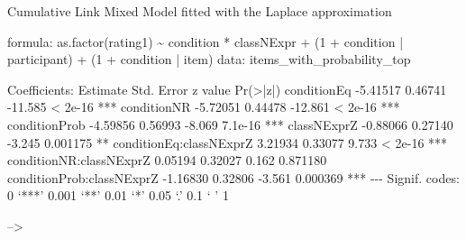 \documentclass[
  letterpaper,
  DIV=11,
  numbers=noendperiod]{scrartcl}
\newenvironment{Shaded}{\begin{snugshade}}{\end{snugshade}}
\newcommand{\DecValTok}[1]{\textcolor[rgb]{0.68,0.00,0.00}{#1}}
\newcommand{\ErrorTok}[1]{\textcolor[rgb]{0.68,0.00,0.00}{#1}}
\newcommand{\FloatTok}[1]{\textcolor[rgb]{0.68,0.00,0.00}{#1}}
\newcommand{\FunctionTok}[1]{\textcolor[rgb]{0.28,0.35,0.67}{#1}}
\newcommand{\NormalTok}[1]{\textcolor[rgb]{0.00,0.23,0.31}{#1}}
\newcommand{\SpecialCharTok}[1]{\textcolor[rgb]{0.37,0.37,0.37}{#1}}
\begin{document}
\begin{Shaded}
\begin{Highlighting}[]
\NormalTok{Cumulative Link Mixed Model fitted with the Laplace approximation}

\NormalTok{formula}\SpecialCharTok{:} \FunctionTok{as.factor}\NormalTok{(rating1) }\SpecialCharTok{\textasciitilde{}}\NormalTok{ condition }\SpecialCharTok{*}\NormalTok{ classNExpr }\SpecialCharTok{+}\NormalTok{ (}\DecValTok{1} \SpecialCharTok{+}\NormalTok{ condition }\SpecialCharTok{|}  
\NormalTok{    participant) }\SpecialCharTok{+}\NormalTok{ (}\DecValTok{1} \SpecialCharTok{+}\NormalTok{ condition }\SpecialCharTok{|}\NormalTok{ item)}
\NormalTok{data}\SpecialCharTok{:}\NormalTok{    items\_with\_probability\_top}

\NormalTok{Coefficients}\SpecialCharTok{:}
\NormalTok{                          Estimate Std. Error z value }\FunctionTok{Pr}\NormalTok{(}\SpecialCharTok{\textgreater{}}\ErrorTok{|}\NormalTok{z}\SpecialCharTok{|}\NormalTok{)    }
\NormalTok{conditionEq               }\SpecialCharTok{{-}}\FloatTok{5.41517}    \FloatTok{0.46741} \SpecialCharTok{{-}}\FloatTok{11.585}  \SpecialCharTok{\textless{}} \FloatTok{2e{-}16} \SpecialCharTok{**}\ErrorTok{*}
\NormalTok{conditionNR               }\SpecialCharTok{{-}}\FloatTok{5.72051}    \FloatTok{0.44478} \SpecialCharTok{{-}}\FloatTok{12.861}  \SpecialCharTok{\textless{}} \FloatTok{2e{-}16} \SpecialCharTok{**}\ErrorTok{*}
\NormalTok{conditionProb             }\SpecialCharTok{{-}}\FloatTok{4.59856}    \FloatTok{0.56993}  \SpecialCharTok{{-}}\FloatTok{8.069}  \FloatTok{7.1e{-}16} \SpecialCharTok{**}\ErrorTok{*}
\NormalTok{classNExprZ               }\SpecialCharTok{{-}}\FloatTok{0.88066}    \FloatTok{0.27140}  \SpecialCharTok{{-}}\FloatTok{3.245} \FloatTok{0.001175} \SpecialCharTok{**} 
\NormalTok{conditionEq}\SpecialCharTok{:}\NormalTok{classNExprZ    }\FloatTok{3.21934}    \FloatTok{0.33077}   \FloatTok{9.733}  \SpecialCharTok{\textless{}} \FloatTok{2e{-}16} \SpecialCharTok{**}\ErrorTok{*}
\NormalTok{conditionNR}\SpecialCharTok{:}\NormalTok{classNExprZ    }\FloatTok{0.05194}    \FloatTok{0.32027}   \FloatTok{0.162} \FloatTok{0.871180}    
\NormalTok{conditionProb}\SpecialCharTok{:}\NormalTok{classNExprZ }\SpecialCharTok{{-}}\FloatTok{1.16830}    \FloatTok{0.32806}  \SpecialCharTok{{-}}\FloatTok{3.561} \FloatTok{0.000369} \SpecialCharTok{**}\ErrorTok{*}
\SpecialCharTok{{-}{-}{-}}
\NormalTok{Signif. codes}\SpecialCharTok{:}  \DecValTok{0}\NormalTok{ ‘}\SpecialCharTok{**}\ErrorTok{*}\NormalTok{’ }\FloatTok{0.001}\NormalTok{ ‘}\SpecialCharTok{**}\NormalTok{’ }\FloatTok{0.01}\NormalTok{ ‘}\SpecialCharTok{*}\NormalTok{’ }\FloatTok{0.05}\NormalTok{ ‘.’ }\FloatTok{0.1}\NormalTok{ ‘ ’ }\DecValTok{1}
\end{Highlighting}
\end{Shaded}

--\textgreater{}


\printbibliography[title=References]
\end{document}
